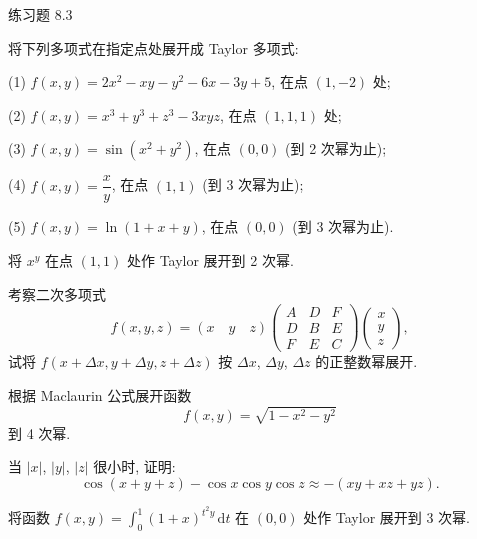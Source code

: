 \begin{exblock}{练习题 8.3}
  \item 将下列多项式在指定点处展开成 Taylor 多项式:

  (1) $f(x, y) = 2x^{2} - xy - y^{2} - 6x - 3y + 5$, 在点 $(1, -2)$ 处;

  (2) $f(x, y) = x^{3} + y^{3} + z^{3} - 3xyz$, 在点 $(1, 1, 1)$ 处;

  (3) $f(x, y) = \sin(x^{2} + y^{2})$, 在点 $(0, 0)$ (到 2 次幂为止);

  (4) $f(x, y) = \dfrac{x}{y}$, 在点 $(1, 1)$ (到 3 次幂为止);

  (5) $f(x, y) = \ln(1 + x + y)$, 在点 $(0, 0)$ (到 3 次幂为止).

  \item 将 $x^{y}$ 在点 $(1, 1)$ 处作 Taylor 展开到 2 次幂.

  \item 考察二次多项式
  \[
    f(x, y, z) = (x\quad y\quad z)\begin{pmatrix} A & D & F \\ D & B & E \\ F & E & C \end{pmatrix}\begin{pmatrix} x \\ y \\ z \end{pmatrix},
  \]
  试将 $f(x + \Delta x, y + \Delta y, z + \Delta z)$ 按 $\Delta x$, $\Delta y$, $\Delta z$ 的正整数幂展开.

  \item 根据 Maclaurin 公式展开函数
  \[
    f(x, y) = \sqrt{1 - x^{2} - y^{2}}
  \]
  到 4 次幂.

  \item 当 $|x|$, $|y|$, $|z|$ 很小时, 证明:
  \[
    \cos(x + y + z) - \cos x\cos y\cos z \approx -(xy + xz + yz).
  \]

  \item 将函数 $f(x, y) = \displaystyle\int_{0}^{1}(1 + x)^{t^{2}y}\,\mathrm{d}t$ 在 $(0, 0)$ 处作 Taylor 展开到 3 次幂.
\end{exblock}
